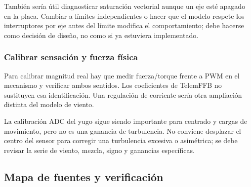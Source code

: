 También sería útil diagnosticar saturación vectorial aunque un eje esté apagado en la placa. Cambiar a límites independientes o hacer que el modelo respete los interruptores por eje antes del límite modifica el comportamiento; debe hacerse como decisión de diseño, no como si ya estuviera implementado.

\subsubsection{Calibrar sensación y fuerza física}
Para calibrar magnitud real hay que medir fuerza/torque frente a PWM en el mecanismo y verificar ambos sentidos. Los coeficientes de TelemFFB no sustituyen esa identificación. Una regulación de corriente sería otra ampliación distinta del modelo de viento.

La calibración ADC del yugo sigue siendo importante para centrado y cargas de movimiento, pero no es una ganancia de turbulencia. No conviene desplazar el centro del sensor para corregir una turbulencia excesiva o asimétrica; se debe revisar la serie de viento, mezcla, signo y ganancias específicas.

\subsection{Mapa de fuentes y verificación}
